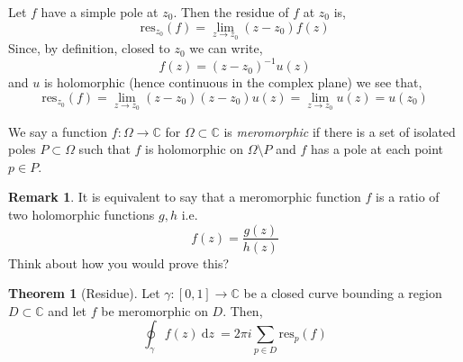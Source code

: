\documentclass{article}
\newcommand{\C}{\mathbb{C}}
\renewcommand{\d}[1]{\: \mathrm{d}#1 \:}
\theoremstyle{definition}
\newtheorem{theorem}{Theorem}[section]
\newtheorem{remark}{Remark}[section]
\newenvironment{definition}[1][Definition:]{\begin{trivlist}
\item[\hskip \labelsep {\bfseries #1}]}{\end{trivlist}}
\begin{document}
\newcommand{\res}{\mathrm{res}}

\begin{definition}
Let $f$ have a simple pole at $z_0$. Then the residue of $f$ at $z_0$ is,
\[ \res_{z_0}(f) = \lim_{z \to z_0} (z - z_0) f(z) \]
Since, by definition, closed to $z_0$ we can write,
\[ f(z) = (z - z_0)^{-1} u(z) \]
and $u$ is holomorphic (hence continuous in the complex plane) we see that,
\[ \res_{z_0}(f) = \lim_{z \to z_0} (z - z_0) (z - z_0) u(z) = \lim_{z \to z_0} u(z) = u(z_0) \]
\end{definition}

\begin{definition}
We say a function $f : \Omega \to \C$ for $\Omega \subset \C$ is \textit{meromorphic} if there is a set of isolated poles $P \subset \Omega$ such that $f$ is holomorphic on $\Omega \setminus P$ and $f$ has a pole at each point $p \in P$.
\end{definition}

\begin{remark}
It is equivalent to say that a meromorphic function $f$ is a ratio of two holomorphic functions $g,h$ i.e.
\[ f(z) = \frac{g(z)}{h(z)} \]
Think about how you would prove this?
\end{remark}

\begin{theorem}[Residue]
Let $\gamma : [0,1] \to \C$ be a closed curve bounding a region $D \subset \C$ and let $f$ be meromorphic on $D$. Then,
\[ \oint_{\gamma} f(z) \d{z} = 2 \pi i \sum_{p \in D} \res_p(f) \]
\end{theorem}
\end{document}
